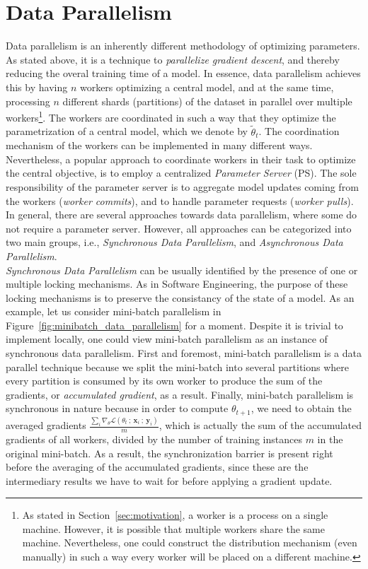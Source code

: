 \section{Data Parallelism}
\label{sec:intro_data_parallelism}

Data parallelism is an inherently different methodology of optimizing parameters. As stated above, it is a technique to \emph{parallelize gradient descent}, and thereby reducing the overal training time of a model. In essence, data parallelism achieves this by having $n$ workers optimizing a central model, and at the same time, processing $n$ different shards (partitions) of the dataset in parallel over multiple workers\footnote{As stated in Section~\ref{sec:motivation}, a worker is a process on a single machine. However, it is possible that multiple workers share the same machine. Nevertheless, one could construct the distribution mechanism (even manually) in such a way every worker will be placed on a different machine.}. The workers are coordinated in such a way that they optimize the parametrization of a central model, which we denote by $\tilde{\theta}_t$. The coordination mechanism of the workers can be implemented in many different ways. Nevertheless, a popular approach to coordinate workers in their task to optimize the central objective, is to employ a centralized \emph{Parameter Server} (PS). The sole responsibility of the parameter server is to aggregate model updates coming from the workers (\emph{worker commits}), and to handle parameter requests (\emph{worker pulls}). In general, there are several approaches towards data parallelism, where some do not require a parameter server. However, all approaches can be categorized into two main groups, i.e., \emph{Synchronous Data Parallelism}, and \emph{Asynchronous Data Parallelism}.\\

\emph{Synchronous Data Parallelism} can be usually identified by the presence of one or multiple locking mechanisms. As in Software Engineering, the purpose of these locking mechanisms is to preserve the consistancy of the state of a model. As an example, let us consider mini-batch parallelism in Figure~\ref{fig:minibatch_data_parallelism} for a moment. Despite it is trivial to implement locally, one could view mini-batch parallelism as an instance of synchronous data parallelism. First and foremost, mini-batch parallelism is a data parallel technique because we split the mini-batch into several partitions where every partition is consumed by its own worker to produce the sum of the gradients, or \emph{accumulated gradient}, as a result. Finally, mini-batch parallelism is synchronous in nature because in order to compute $\theta_{t+1}$, we need to obtain the averaged gradients $\frac{\sum_i \nabla_\theta \mathcal{L}(\theta_t~;~\textbf{x}_i~;~\textbf{y}_i)}{m}$, which is actually the sum of the accumulated gradients of all workers, divided by the number of training instances $m$ in the original mini-batch. As a result, the synchronization barrier is present right before the averaging of the accumulated gradients, since these are the intermediary results we have to wait for before applying a gradient update.

